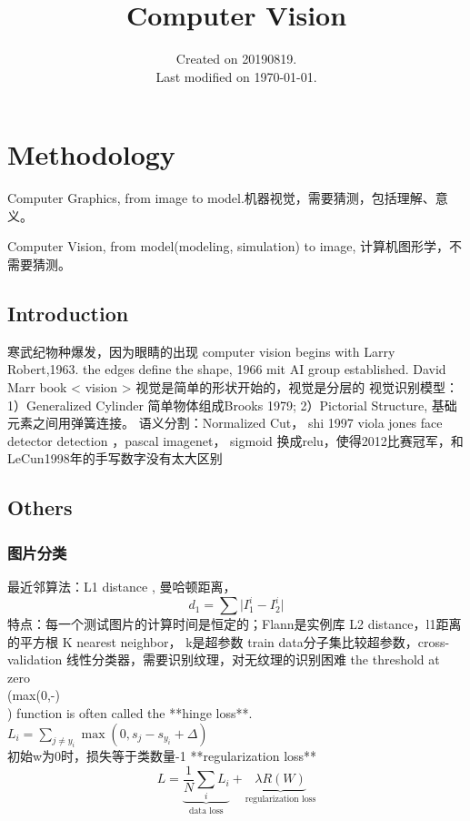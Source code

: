 \documentclass[UTF8]{book}
\begin{document}
\title{Computer Vision}
\date{Created on 20190819.\\   Last modified on \today.}
\maketitle


\tableofcontents


\chapter{Methodology}

Computer Graphics, from image to model.机器视觉，需要猜测，包括理解、意义。

Computer Vision, from model(modeling, simulation) to image, 计算机图形学，不需要猜测。


\section{Introduction}
    寒武纪物种爆发，因为眼睛的出现
    computer vision begins with Larry Robert,1963. the edges define the shape, 1966 mit AI group established. 
    David Marr book < vision >
    视觉是简单的形状开始的，视觉是分层的
    视觉识别模型：1）Generalized Cylinder 简单物体组成Brooks 1979; 2）Pictorial Structure, 基础元素之间用弹簧连接。
    语义分割：Normalized Cut， shi 1997
    viola jones face detector
    detection ，pascal imagenet，
    sigmoid 换成relu，使得2012比赛冠军，和LeCun1998年的手写数字没有太大区别

\section{Others}
    
    
\subsection{图片分类}
    最近邻算法：L1 distance , 曼哈顿距离，
    \begin{equation}
        d_1=\sum \lvert I_1^i -I_2^i \lvert
    \end{equation}
    特点：每一个测试图片的计算时间是恒定的；Flann是实例库
    L2 distance，l1距离的平方根
    K nearest neighbor， k是超参数
    train data分子集比较超参数，cross-validation 
    线性分类器，需要识别纹理，对无纹理的识别困难
    the threshold at zero \\(max(0,-)\\) function is often called the **hinge loss**. \\
    $
    L_i = \sum_{j\neq y_i} \max(0, s_j - s_{y_i} + \Delta)
    $\\
    初始w为0时，损失等于类数量-1
    **regularization loss**\\
    \begin{equation}
        L =  \underbrace{ \frac{1}{N} \sum_i L_i }_\text{data loss} + \underbrace{ \lambda R(W) }_\text{regularization loss}
    \end{equation}
\end{document}
